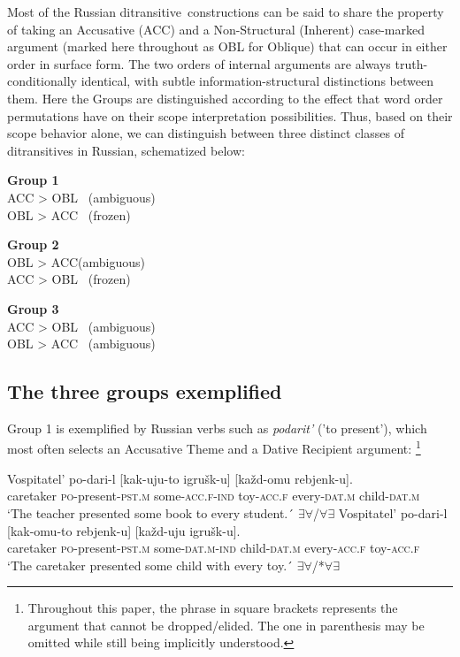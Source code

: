 \documentclass[output=paper,colorlinks,citecolor=brown,modfonts,nonflat]{langsci/langscibook}
\begin{document}
Most of the Russian ditransitive~constructions can be said to share the property of taking an Accusative (ACC) and a Non-Structural (Inherent) case-marked argument (marked here throughout as OBL for Oblique) that can occur in either order in surface form. The two orders of internal arguments are always truth-conditionally identical, with subtle information-structural distinctions between them. Here the Groups are distinguished according to the effect that word order permutations have on their scope interpretation possibilities. Thus, based on their scope behavior alone, we can distinguish between three distinct classes of ditransitives in Russian, schematized below:

\ea%
    \label{ex:antonyuk:9}
    \textbf{Group 1}\\
    ACC > OBL ~(ambiguous)\\
    OBL > ACC ~(frozen)
    \z

\ea%
    \label{ex:antonyuk:10}
    \textbf{Group 2}\\
    OBL > ACC(ambiguous)\\
    ACC > OBL ~(frozen)
    \z

\ea%
    \label{ex:antonyuk:11}
    \textbf{Group 3}\\
    ACC > OBL ~(ambiguous)\\
    OBL > ACC ~(ambiguous)
    \z

\subsection{The three groups exemplified}\label{sec:antonyuk:2.1}

Group 1 is exemplified by Russian verbs such as \textit{podarit’} ('to present’), which most often selects an Accusative Theme and a Dative Recipient argument: \footnote{Throughout this paper, the phrase in square brackets represents the argument that cannot be dropped/elided. The one in parenthesis may be omitted while still being implicitly understood.}


\ea%
    \label{ex:antonyuk:12}
    \ea \label{ex:antonyuk:12a}
    \gll    Vospitatel’ po-dari-l [kak-uju-to igrušk-u] [každ-omu rebjenk-u].\\
            caretaker \textsc{po-}present\textsc{-pst.m} \hspaceThis{[}some\textsc{-acc.f-ind} toy\textsc{-acc.f} \hspaceThis{[}every\textsc{-dat.m} child\textsc{-dat.m}\\
    \glt    `The teacher presented some book to every student.´ 
            \hfill ${\exists}{\forall}$/${\forall}{\exists}$
    \ex \label{ex:antonyuk:12b}
    \gll    Vospitatel’ po-dari-l [kak-omu-to rebjenk-u] [každ-uju igrušk-u].\\
            caretaker \textsc{po-}present\textsc{-pst.m} \hspaceThis{[}some\textsc{-dat.m-ind} child\textsc{-dat.m} \hspaceThis{[}every\textsc{-acc.f} toy\textsc{-acc.f}\\
    \glt    `The caretaker presented some child with every toy.´ 
            \hfill ${\exists}{\forall}$/*${\forall}{\exists}$
    \z
\z
\end{document}
